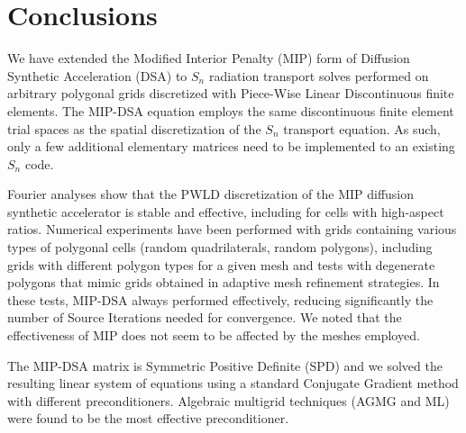 \documentclass[preprint,10pt]{elsarticle}
\renewcommand{\(}{\left(}
\renewcommand{\)}{\right)}
\renewcommand{\[}{\left[}
\renewcommand{\]}{\right]}
\newcommand{\sn}{\ensuremath{S_n}\xspace}
\begin{document}

\section{Conclusions} \label{sec_conc}

We have extended the Modified Interior Penalty (MIP) form of Diffusion Synthetic Acceleration (DSA) 
to \sn radiation transport solves performed on arbitrary polygonal grids discretized 
with Piece-Wise Linear Discontinuous finite elements. 
The MIP-DSA equation employs the same discontinuous finite element trial spaces as 
the spatial discretization of the \sn transport equation. As such, 
only a few additional elementary matrices need to be implemented to an existing \sn code. 

Fourier analyses show that the PWLD discretization of the MIP diffusion synthetic accelerator 
is stable and effective, including for cells with high-aspect ratios. 
%
Numerical experiments have been performed with grids containing various types of polygonal cells
(random quadrilaterals, random polygons), including
grids with different polygon types for a given mesh and tests with degenerate polygons that mimic
grids obtained in adaptive mesh refinement strategies. In these tests, MIP-DSA always performed effectively,
reducing significantly the number of Source Iterations needed for convergence. 
We noted that the effectiveness of MIP does not seem to be affected by the meshes employed. 
%

The MIP-DSA  matrix is Symmetric Positive Definite (SPD) and we solved the resulting linear system 
of equations using a standard Conjugate Gradient method with different preconditioners. 
Algebraic multigrid techniques (AGMG and ML) were found to be the most
effective preconditioner.
\end{document}
